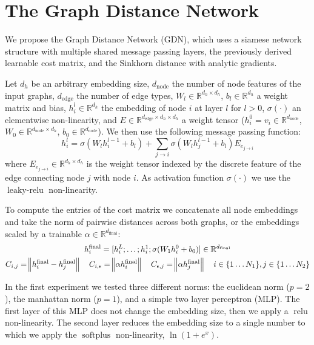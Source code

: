 \section{The Graph Distance Network}

We propose the Graph Distance Network (GDN), which uses a siamese network structure with multiple shared message passing layers, the previously derived learnable cost matrix, and the Sinkhorn distance with analytic gradients.

Let $d_h$ be an arbitrary embedding size, $d_{\text{node}}$ the number of node features of the input graphs, $d_{\text{edge}}$ the number of edge types, $W_l \in \mathbb{R}^{d_h \times d_h}$, $b_l \in   \mathbb{R}^{d_h}$ a weight matrix and bias, $h_i^l \in \mathbb{R}^{d_h}$ the embedding of node $i$ at layer $l$ for $l > 0$, $\sigma(\cdot)$ an elementwise non-linearity, and $E \in \mathbb{R}^{d_{\text{edge}} \times d_h \times d_h}$ a weight tensor ($h_i^0 = v_i \in \mathbb{R}^{d_{\text{node}}}$, $W_0 \in \mathbb{R}^{d_{\text{node}} \times d_h}$, $b_0 \in \mathbb{R}^{d_{\text{node}}}$). We then use the following message passing function:
\begin{equation}
     h_i^{l} = \sigma(W_{l} h_i^{l-1} + b_l) + \sum_{j \rightarrow i} \sigma(W_{l} h_j^{l-1} + b_l) E_{e_{j \rightarrow i}}
\end{equation}
where $E_{e_{j \rightarrow i}} \in \mathbb{R}^{d_h \times d_h}$ is the weight tensor indexed by the discrete feature of the edge connecting node $j$ with node $i$. As activation function $\sigma(\cdot)$ we use the $\operatorname{leaky-relu}$ non-linearity.

To compute the entries of the cost matrix we concatenate all node embeddings and take the norm of pairwise distances across both graphs, or the embeddings scaled by a trainable $\alpha \in \mathbb{R}^{d_\text{final}}$:
\begin{equation}
     \begin{gathered}
          h_i^\text{final} = [h_i^L ; \dots ; h_i^1 ; \sigma(W_{1} h_i^{0} + b_0)] \in \mathbb{R}^{d_\text{final}}\\
          C_{i,j} = \norm{h_i^\text{final} - h_j^\text{final}} \quad
          C_{i, \epsilon} = \norm{ \alpha h_i^\text{final}} \quad
          C_{\epsilon, j} = \norm{ \alpha h_j^\text{final}} \quad i \in \{1 \dots N_1\}, j \in \{1 \dots N_2\}
     \end{gathered}
\end{equation}

In the first experiment we tested three different norms: the euclidean norm ($p=2$), the manhattan norm ($p=1$), and a simple two layer perceptron (MLP). The first layer of this MLP does not change the embedding size, then we apply a $\operatorname{relu}$ non-linearity. The second layer reduces the embedding size to a single number to which we apply the $\operatorname{softplus}$ non-linearity, $\ln(1 + e^x)$.


